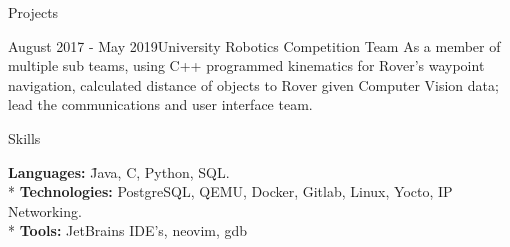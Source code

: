 \documentclass{article}
\newlength{\tabin}
\newlength{\secsep}
\newcommand{\lineunder}{\vspace*{-8pt} \\ \hspace*{-6pt} \hrulefill \\ \vspace*{-15pt}}
\newenvironment{tabbedsection}[1]{
	\begin{list}{}{
			\setlength{\itemsep}{0pt}
			\setlength{\labelsep}{0pt}
			\setlength{\labelwidth}{0pt}
			\setlength{\leftmargin}{0pt}
			\setlength{\rightmargin}{\tabin}
			\setlength{\listparindent}{0pt}
			\setlength{\parsep}{0pt}
			\setlength{\parskip}{0pt}
			\setlength{\partopsep}{0pt}
			\setlength{\topsep}{#1}
		}
		\item[]
	}{\end{list}}
\newenvironment{nospacetabbing}{
	\begin{tabbing}
	}{\end{tabbing}\vspace{-1.2em}}
\newenvironment{resume_section}[1]{
	\filbreak
	\vspace{2\secsep}
	\textsc{\color{blue}\large#1}
	\lineunder
	\begin{tabbedsection}{\secsep}
	}{\end{tabbedsection}}
\newenvironment{resume_subsection}[2]{
	\textbf{\color{BlueViolet}#2} \hfill {\normalsize (#1)} \hspace{-5em}
	\begin{tabbedsection}{0.5\secsep}
		\begin{subitems}
		}{\end{subitems}\end{tabbedsection}}
\newenvironment{subitems}{
	\renewcommand{\labelitemi}{-}
	\begin{itemize}
		\setlength{\labelsep}{1em}
	}{\end{itemize}}
\begin{document}
\begin{resume_section}{Projects}
\begin{resume_subsection}{August 2017 - May 2019}{University Robotics Competition Team}
			As a member of multiple sub teams, using C++ programmed kinematics for Rover’s waypoint navigation, calculated distance of
			objects to Rover given Computer Vision data; lead the communications and user interface team.
		\end{resume_subsection}
		\vspace{2\secsep}
		\iffalse
		\begin{resume_subsection}{Fall 2018}{Mobile Robotics Project}
			Programmed in C++ to implemented GPS navigation, path planning, and tennis ball (object) detection for autonomous traversal task.
			Using the random error from GPS measurements, created a random searching method. Interfacing programs and data with Robotic
			Operating System. Created simple reactive obstacle avoidance and a waypoint navigation inspired by bug algorithm.
		\end{resume_subsection}
		\fi
	\end{resume_section}
	
	\begin{resume_section}{Skills}
	\begin{nospacetabbing}
		\textbf{Languages:} \hspace{5em} \=Java, C, Python, SQL.\\*
		\textbf{Technologies:} \> PostgreSQL, QEMU, Docker, Gitlab, Linux, Yocto, IP Networking.\\*
		\textbf{Tools:} \> JetBrains IDE's, neovim, gdb
	\end{nospacetabbing}
	\end{resume_section}
	
\end{document}
